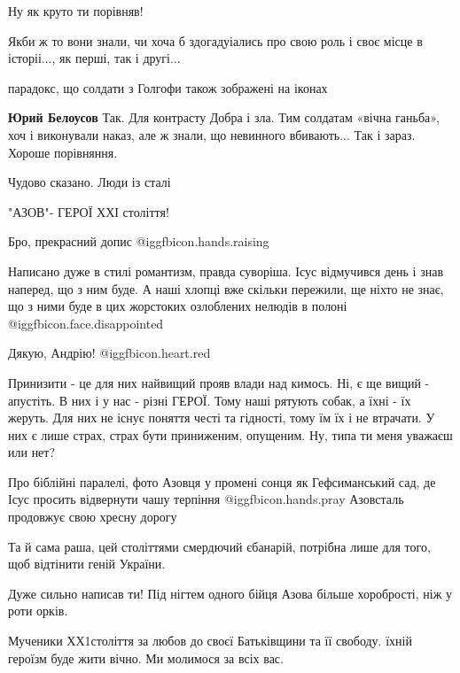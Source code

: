 \begin{itemize}
Ну як круто ти порівняв!


Якби ж то вони знали, чи хоча б здогадуіались про свою роль і своє місце в
історіі..., як перші, так і другі...

парадокс, що солдати з Голгофи також зображені на іконах

\textbf{Юрий Белоусов}
Так. Для контрасту Добра і зла.
Тим солдатам «вічна ганьба», хоч і виконували наказ, але ж знали, що невинного вбивають... Так і зараз.
Хороше порівняння.

Чудово сказано. Люди із сталі

"АЗОВ"- ГЕРОЇ ХХІ століття!

Бро, прекрасний допис  @igg{fbicon.hands.raising}


Написано дуже в стилі романтизм, правда суворіша. Ісус відмучився день і знав
наперед, що з ним буде. А наші хлопці вже скільки пережили, ще ніхто не знає,
що з ними буде в цих жорстоких озлоблених нелюдів в полоні @igg{fbicon.face.disappointed} 

Дякую, Андрію! @igg{fbicon.heart.red}


Принизити - це для них найвищий прояв влади над кимось. Ні, є ще вищий -
апустіть. В них і у нас - різні ГЕРОЇ. Тому наші рятують собак, а їхні - їх
жеруть. Для них не існує поняття честі та гідності, тому їм їх і не втрачати. У
них є лише страх, страх бути приниженим, опущеним. Ну, типа ти меня уважаєш или
нет?


Про біблійні паралелі, фото Азовця у промені сонця як Гефсиманський сад, де
Ісус просить відвернути чашу терпіння  @igg{fbicon.hands.pray}  Азовсталь продовжує свою хресну дорогу


Та й сама раша, цей століттями смердючий єбанарій, потрібна лише для того, щоб
відтінити геній України.


Дуже сильно написав ти! Під нігтем одного бійця Азова більше хоробрості, ніж у
роти орків.


Мученики ХХ1століття за любов до своєї Батьківщини та її свободу. їхній героїзм
буде жити вічно. Ми молимося за всіх вас.


\end{itemize}
